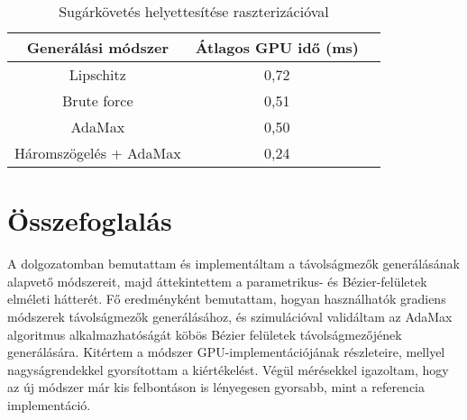\begin{table}[H]
	\begin{center}
		\begin{tabular}{| c || c | c |}
			\hline
			\textbf{Generálási módszer} & \textbf{Átlagos GPU idő (ms)} \\ 
			\hline\hline
			Lipschitz & 0,72 \\
			\hline
			Brute force & 0,51 \\
			\hline
			AdaMax & 0,50 \\
			\hline
			Háromszögelés + AdaMax & 0,24 \\
			\hline
		\end{tabular}
	\end{center}
	\caption{Sugárkövetés helyettesítése raszterizációval}
	\label{tab:rast}
\end{table}





\chapter{Összefoglalás}
\label{ch:sum}

A dolgozatomban bemutattam és implementáltam a távolságmezők generálásának alapvető módszereit, majd áttekintettem a parametrikus- és Bézier-felületek elméleti hátterét. Fő eredményként bemutattam, hogyan használhatók gradiens módszerek távolságmezők generálásához, és szimulációval validáltam az AdaMax algoritmus alkalmazhatóságát köbös Bézier felületek távolságmezőjének generálására. Kitértem a módszer GPU-implementációjának részleteire, mellyel nagyságrendekkel gyorsítottam a kiértékelést. Végül mérésekkel igazoltam, hogy az új módszer már kis felbontáson is lényegesen gyorsabb, mint a referencia implementáció.
